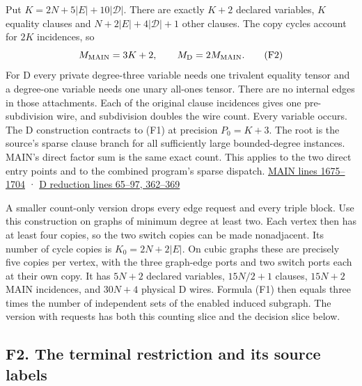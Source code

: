 \documentclass[
  11pt,
]{article}
\begin{document}
Put \(K=2N+5|E|+10|\mathcal D|\). There are exactly \(K+2\) declared
variables, \(K\) equality clauses and \(N+2|E|+4|\mathcal D|+1\) other
clauses. The copy cycles account for \(2K\) incidences, so \[
 M_{\rm MAIN}=3K+2,\qquad M_{\rm D}=2M_{\rm MAIN}.
 \tag{F2}
\] For D every private degree-three variable needs one trivalent
equality tensor and a degree-one variable needs one unary all-ones
tensor. There are no internal edges in those attachments. Each of the
original clause incidences gives one pre-subdivision wire, and
subdivision doubles the wire count. Every variable occurs. The D
construction contracts to (F1) at precision \(P_0=K+3\). The root is the
source's sparse clause branch for all sufficiently large bounded-degree
instances. MAIN's direct factor sum is the same exact count. This
applies to the two direct entry points and to the combined program's
sparse dispatch.
\href{https://github.com/openai/math/blob/main/preprints/The-Exponential-Time-Hypothesis-is-False-October-25-2026/build/main_full_version.tex\#L1675}{MAIN
lines 1675--1704} ·
\href{https://github.com/openai/math/blob/main/preprints/The-Exponential-Time-Hypothesis-is-False-October-25-2026/build/quantitative-reduction.tex\#L65}{D
reduction lines 65--97, 362--369}

A smaller count-only version drops every edge request and every triple
block. Use this construction on graphs of minimum degree at least two.
Each vertex then has at least four copies, so the two switch copies can
be made nonadjacent. Its number of cycle copies is \(K_0=2N+2|E|\). On
cubic graphs these are precisely five copies per vertex, with the three
graph-edge ports and two switch ports each at their own copy. It has
\(5N+2\) declared variables, \(15N/2+1\) clauses, \(15N+2\) MAIN
incidences, and \(30N+4\) physical D wires. Formula (F1) then equals
three times the number of independent sets of the enabled induced
subgraph. The version with requests has both this counting slice and the
decision slice below.

\subsection{F2. The terminal restriction and its source
labels}\label{v8-f2.-the-terminal-restriction-and-its-source-labels}
\end{document}

